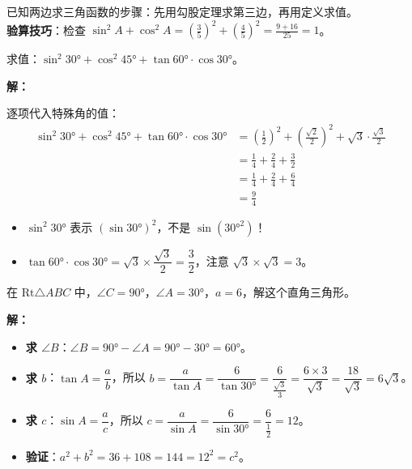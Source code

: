 \documentclass[12pt, a4paper]{ctexart}
\begin{document}
\begin{tipbox}[方法小结]
已知两边求三角函数的步骤：先用勾股定理求第三边，再用定义求值。\\
\textbf{验算技巧}：检查 $\sin^2 A + \cos^2 A = \left(\frac{3}{5}\right)^2+\left(\frac{4}{5}\right)^2 = \frac{9+16}{25}=1$。\checkmark
\end{tipbox}

\begin{examplebox}[【例题2】特殊角的混合计算]
求值：$\sin^2 30° + \cos^2 45° + \tan 60° \cdot \cos 30°$。
\end{examplebox}

\textbf{解：}

逐项代入特殊角的值：
\begin{align*}
\sin^2 30° + \cos^2 45° + \tan 60° \cdot \cos 30°
&= \left(\frac{1}{2}\right)^2 + \left(\frac{\sqrt{2}}{2}\right)^2 + \sqrt{3} \cdot \frac{\sqrt{3}}{2} \\[6pt]
&= \frac{1}{4} + \frac{2}{4} + \frac{3}{2} \\[6pt]
&= \frac{1}{4} + \frac{2}{4} + \frac{6}{4} \\[6pt]
&= \boxed{\frac{9}{4}}
\end{align*}

\begin{warnbox}[计算提醒]
\begin{itemize}[nosep, leftmargin=1.5em]
  \item $\sin^2 30°$ 表示 $(\sin 30°)^2$，不是 $\sin(30°^2)$！
  \item $\tan 60° \cdot \cos 30° = \sqrt{3} \times \dfrac{\sqrt{3}}{2} = \dfrac{3}{2}$，注意 $\sqrt{3}\times\sqrt{3}=3$。
\end{itemize}
\end{warnbox}

\begin{examplebox}
在 $\text{Rt}\triangle ABC$ 中，$\angle C=90°$，$\angle A=30°$，$a=6$，解这个直角三角形。
\end{examplebox}

\textbf{解：}

\begin{itemize}[nosep, leftmargin=2em]
  \item \textbf{求 $\angle B$}：$\angle B = 90° - \angle A = 90° - 30° = 60°$。
  \item \textbf{求 $b$}：$\tan A = \dfrac{a}{b}$，所以 $b = \dfrac{a}{\tan A} = \dfrac{6}{\tan 30°} = \dfrac{6}{\frac{\sqrt{3}}{3}} = \dfrac{6\times 3}{\sqrt{3}} = \dfrac{18}{\sqrt{3}} = 6\sqrt{3}$。
  \item \textbf{求 $c$}：$\sin A = \dfrac{a}{c}$，所以 $c = \dfrac{a}{\sin A} = \dfrac{6}{\sin 30°} = \dfrac{6}{\frac{1}{2}} = 12$。
  \item \textbf{验证}：$a^2+b^2 = 36+108 = 144 = 12^2 = c^2$。\checkmark
\end{itemize}
\end{document}
